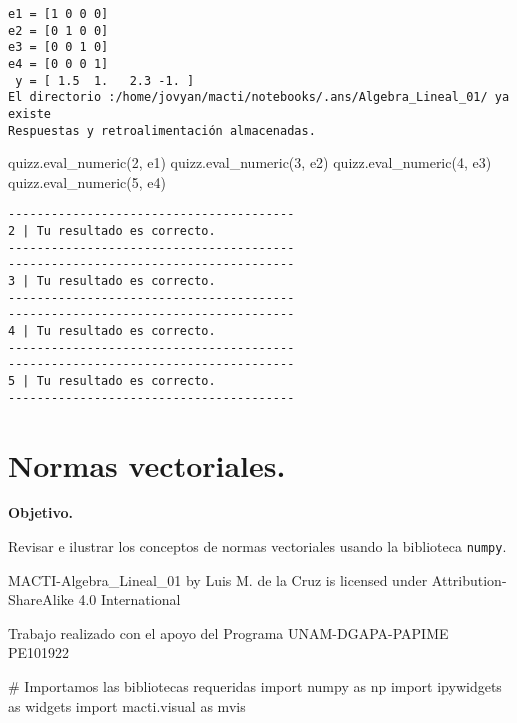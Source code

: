 \documentclass[
  letterpaper,
  DIV=11,
  numbers=noendperiod]{scrreprt}
\newenvironment{Shaded}{\begin{snugshade}}{\end{snugshade}}
\newcommand{\CommentTok}[1]{\textcolor[rgb]{0.37,0.37,0.37}{#1}}
\newcommand{\ImportTok}[1]{\textcolor[rgb]{0.00,0.46,0.62}{#1}}
\newcommand{\NormalTok}[1]{\textcolor[rgb]{0.00,0.23,0.31}{#1}}
\newcommand{\StringTok}[1]{\textcolor[rgb]{0.13,0.47,0.30}{#1}}
\begin{document}
\begin{verbatim}
e1 = [1 0 0 0]
e2 = [0 1 0 0]
e3 = [0 0 1 0]
e4 = [0 0 0 1]
 y = [ 1.5  1.   2.3 -1. ]
El directorio :/home/jovyan/macti/notebooks/.ans/Algebra_Lineal_01/ ya existe
Respuestas y retroalimentación almacenadas.
\end{verbatim}

\begin{Shaded}
\begin{Highlighting}[]
\NormalTok{quizz.eval\_numeric(}\StringTok{\textquotesingle{}2\textquotesingle{}}\NormalTok{, e1)}
\NormalTok{quizz.eval\_numeric(}\StringTok{\textquotesingle{}3\textquotesingle{}}\NormalTok{, e2)}
\NormalTok{quizz.eval\_numeric(}\StringTok{\textquotesingle{}4\textquotesingle{}}\NormalTok{, e3)}
\NormalTok{quizz.eval\_numeric(}\StringTok{\textquotesingle{}5\textquotesingle{}}\NormalTok{, e4)}
\end{Highlighting}
\end{Shaded}

\begin{verbatim}
----------------------------------------
2 | Tu resultado es correcto.
----------------------------------------
----------------------------------------
3 | Tu resultado es correcto.
----------------------------------------
----------------------------------------
4 | Tu resultado es correcto.
----------------------------------------
----------------------------------------
5 | Tu resultado es correcto.
----------------------------------------
\end{verbatim}


\chapter{Normas vectoriales.}\label{normas-vectoriales.}

\textbf{Objetivo.}

Revisar e ilustrar los conceptos de normas vectoriales usando la
biblioteca \texttt{numpy}.

MACTI-Algebra\_Lineal\_01 by Luis M. de la Cruz is licensed under
Attribution-ShareAlike 4.0 International

Trabajo realizado con el apoyo del Programa UNAM-DGAPA-PAPIME PE101922

\begin{Shaded}
\begin{Highlighting}[]
\CommentTok{\# Importamos las bibliotecas requeridas}
\ImportTok{import}\NormalTok{ numpy }\ImportTok{as}\NormalTok{ np}
\ImportTok{import}\NormalTok{ ipywidgets }\ImportTok{as}\NormalTok{ widgets}
\ImportTok{import}\NormalTok{ macti.visual }\ImportTok{as}\NormalTok{ mvis}
\end{Highlighting}
\end{Shaded}
\end{document}
